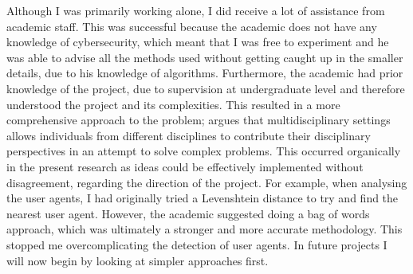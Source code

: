 Although I was primarily working alone, I did receive a lot of assistance from academic staff. This was successful because the academic does not have any knowledge of cybersecurity, which meant that I was free to experiment and he was able to advise all the methods used without getting caught up in the smaller details, due to his knowledge of algorithms. Furthermore, the academic had prior knowledge of the project, due to supervision at undergraduate level and therefore understood the project and its complexities. This resulted in a more comprehensive approach to the problem; \cite{thurow1999dynamics} argues that multidisciplinary settings allows individuals from different disciplines to contribute their disciplinary perspectives in an attempt to solve complex problems. This occurred organically in the present research as ideas could be effectively implemented without disagreement, regarding the direction of the project. For example, when analysing the user agents, I had originally tried a Levenshtein distance to try and find the nearest user agent. However, the academic suggested doing a bag of words approach, which was ultimately a stronger and more accurate methodology. This stopped me overcomplicating the detection of user agents. In future projects I will now begin by looking at simpler approaches first.



